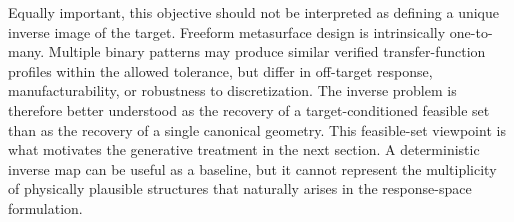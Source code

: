 Equally important, this objective should not be interpreted as defining a unique inverse image of the target. Freeform metasurface design is intrinsically one-to-many. Multiple binary patterns may produce similar verified transfer-function profiles within the allowed tolerance, but differ in off-target response, manufacturability, or robustness to discretization. The inverse problem is therefore better understood as the recovery of a target-conditioned feasible set than as the recovery of a single canonical geometry. This feasible-set viewpoint is what motivates the generative treatment in the next section. A deterministic inverse map can be useful as a baseline, but it cannot represent the multiplicity of physically plausible structures that naturally arises in the response-space formulation.
